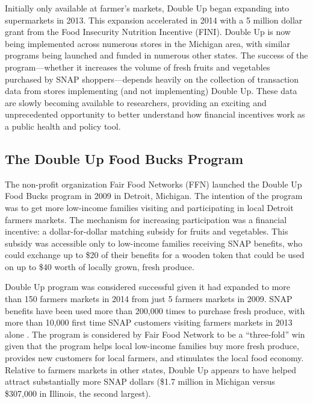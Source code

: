 \documentclass[12pt,letterpaperpaper,]{book}
\begin{document}
Initially only available at farmer's markets, Double Up began expanding
into supermarkets in 2013. This expansion accelerated in 2014 with a 5
million dollar grant from the Food Insecurity Nutrition Incentive
(FINI). Double Up is now being implemented across numerous stores in the
Michigan area, with similar programs being launched and funded in
numerous other states. The success of the program---whether it increases
the volume of fresh fruits and vegetables purchased by SNAP
shoppers---depends heavily on the collection of transaction data from
stores implementing (and not implementing) Double Up. These data are
slowly becoming available to researchers, providing an exciting and
unprecedented opportunity to better understand how financial incentives
work as a public health and policy tool.

\subsection{The Double Up Food Bucks
Program}\label{the-double-up-food-bucks-program}

The non-profit organization Fair Food Networks (FFN) launched the Double
Up Food Bucks program in 2009 in Detroit, Michigan. The intention of the
program was to get more low-income families visiting and participating
in local Detroit farmers markets. The mechanism for increasing
participation was a financial incentive: a dollar-for-dollar matching
subsidy for fruits and vegetables. This subsidy was accessible only to
low-income families receiving SNAP benefits, who could exchange up to
\$20 of their benefits for a wooden token that could be used on up to
\$40 worth of locally grown, fresh produce.

Double Up program was considered successful given it had expanded to
more than 150 farmers markets in 2014 from just 5 farmers markets in
2009. SNAP benefits have been used more than 200,000 times to purchase
fresh produce, with more than 10,000 first time SNAP customers visiting
farmers markets in 2013 alone \citep{fair_food_network_double_2014}. The
program is considered by Fair Food Network to be a ``three-fold'' win
given that the program helps local low-income families buy more fresh
produce, provides new customers for local farmers, and stimulates the
local food economy. Relative to farmers markets in other states, Double
Up appears to have helped attract substantially more SNAP dollars (\$1.7
million in Michigan versus \$307,000 in Illinois, the second largest).
\end{document}
